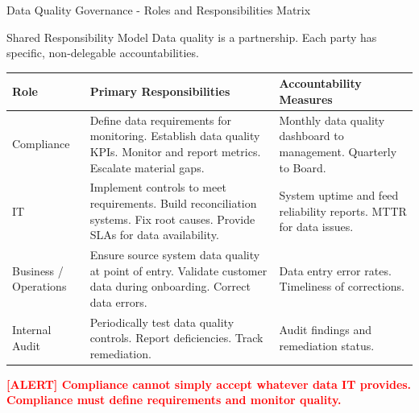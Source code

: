 \documentclass[11pt,a4paper]{beamer}
\newcommand{\redflag}[1]{\textcolor{red}{\textbf{[ALERT] #1}}}
\begin{document}
	\begin{frame}{Data Quality Governance - Roles and Responsibilities Matrix}
		\begin{block}{Shared Responsibility Model}
			Data quality is a partnership. Each party has specific, non-delegable accountabilities.
		\end{block}
		
		\begin{longtable}{p{}|p{}|p{}}
			\hline
			\rowcolor{lightgray}
			\textbf{Role} & \textbf{Primary Responsibilities} & \textbf{Accountability Measures} \\
			\hline
			Compliance & Define data requirements for monitoring. Establish data quality KPIs. Monitor and report metrics. Escalate material gaps. & Monthly data quality dashboard to management. Quarterly to Board. \\
			\hline
			IT & Implement controls to meet requirements. Build reconciliation systems. Fix root causes. Provide SLAs for data availability. & System uptime and feed reliability reports. MTTR for data issues. \\
			\hline
			Business / Operations & Ensure source system data quality at point of entry. Validate customer data during onboarding. Correct data errors. & Data entry error rates. Timeliness of corrections. \\
			\hline
			Internal Audit & Periodically test data quality controls. Report deficiencies. Track remediation. & Audit findings and remediation status. \\
			\hline
		\end{longtable}
		
		\redflag{Compliance cannot simply accept whatever data IT provides. Compliance must define requirements and monitor quality.}
	\end{frame}
	
\end{document}

